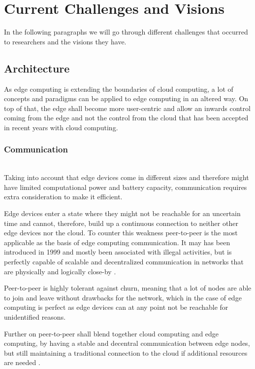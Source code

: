 \section{Current Challenges and Visions}\label{sec:main}

In the following paragraphs we will go through different challenges that occurred to researchers and the visions they have.

\subsection{Architecture}
As edge computing is extending the boundaries of cloud computing, a lot of concepts and paradigms can be applied to edge computing in an altered way. On top of that, the edge shall become more user-centric and allow an inwards control coming from the edge and not the control from the cloud that has been accepted in recent years with cloud computing.

\subsubsection{Communication}\hspace*{\fill} \\
Taking into account that edge devices come in different sizes and therefore might have limited computational power and battery capacity, communication requires extra consideration to make it efficient.

Edge devices enter a state where they might not be reachable for an uncertain time and cannot, therefore, build up a continuous connection to neither other edge devices nor the cloud.
To counter this weakness peer-to-peer is the most applicable as the basis of edge computing communication. It may has been introduced in 1999 and mostly been associated with illegal activities, but is perfectly capable of scalable and decentralized communication in networks that are physically and logically close-by \cite{GarciaLopez:2015:ECV:2831347.2831354}.

Peer-to-peer is highly tolerant against churn, meaning that a lot of nodes are able to join and leave without drawbacks for the network, which in the case of edge computing is perfect as edge devices can at any point not be reachable for unidentified reasons.

Further on peer-to-peer shall blend together cloud computing and edge computing, by having a stable and decentral communication between edge nodes, but still maintaining a traditional connection to the cloud if additional resources are needed \cite{GarciaLopez:2015:ECV:2831347.2831354}.


